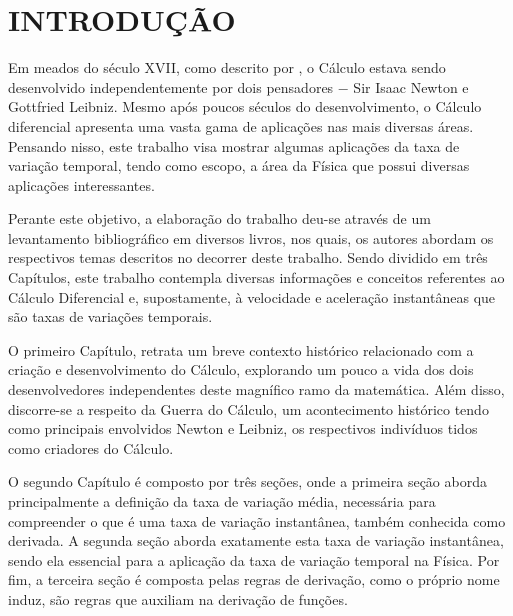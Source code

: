 \documentclass[
	12pt,				%
	openright,			%
    twoside,			%
	a4paper,			%
	chapter=TITLE,		%
	english,			%
	french,				%
	spanish,			%
	brazil				%
	]{abntex2}
\numberwithin{lema}{chapter}
\numberwithin{teorema}{chapter}
\numberwithin{definicao}{chapter}
\numberwithin{exemplo}{chapter}
\numberwithin{figure}{chapter}
\begin{document}
\tableofcontents*
\cleardoublepage

\textual
\newtheorem{prop}{Proposição}[]
\chapter*[INTRODUÇÃO]{INTRODUÇÃO}
\thispagestyle{empty}

Em meados do século XVII, como descrito por , o Cálculo estava sendo desenvolvido independentemente por dois pensadores $-$ Sir Isaac Newton e Gottfried Leibniz. Mesmo após poucos séculos do desenvolvimento, o Cálculo diferencial apresenta uma vasta gama de aplicações nas mais diversas áreas. Pensando nisso, este trabalho visa mostrar algumas aplicações da taxa de variação temporal, tendo como escopo, a área da Física que possui diversas aplicações interessantes.

Perante este objetivo, a elaboração do trabalho deu-se através de um levantamento bibliográfico em diversos livros, nos quais, os autores abordam os respectivos temas descritos no decorrer deste trabalho. Sendo dividido em três Capítulos, este trabalho contempla diversas informações e conceitos referentes ao Cálculo Diferencial e, supostamente, à velocidade e aceleração instantâneas que são taxas de variações temporais.

O primeiro Capítulo, retrata um breve contexto histórico relacionado com a criação e desenvolvimento do Cálculo, explorando um pouco a vida dos dois desenvolvedores independentes deste magnífico ramo da matemática. Além disso, discorre-se a respeito da Guerra do Cálculo, um acontecimento histórico tendo como principais envolvidos Newton e Leibniz, os respectivos indivíduos tidos como criadores do Cálculo.

O segundo Capítulo é composto por três seções, onde a primeira seção aborda principalmente a definição da taxa de variação média, necessária para compreender o que é uma taxa de variação instantânea, também conhecida como derivada. A segunda seção aborda exatamente esta taxa de variação instantânea, sendo ela essencial para a aplicação da taxa de variação temporal na Física. Por fim, a terceira seção é composta pelas regras de derivação, como o próprio nome induz, são regras que auxiliam na derivação de funções.
\end{document}
